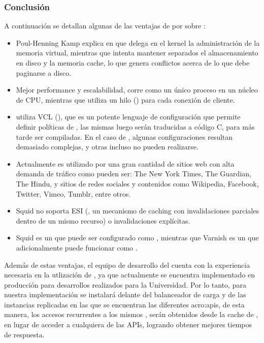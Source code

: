 \subsubsection{Conclusión}

A continuación se detallan algunas de las ventajas de  por sobre :

\begin{itemize}
  \item Poul-Henning Kamp explica en \cite{website:varnish-cache.org} que  delega en el kernel la administración de la memoria virtual, mientras que  intenta mantener separados el almacenamiento en disco y la memoria cache, lo que genera conflictos acerca de lo que debe paginarse a disco.

  \item Mejor performance y escalabilidad,  corre como un único proceso en un núcleo de CPU, mientras que  utiliza un hilo () para cada conexión de cliente.

  \item {} utiliza VCL (), que es un potente lenguaje de configuración que permite definir políticas de , las mismas luego serán traducidas a código C, para más tarde ser compiladas.  En el caso de , algunas configuraciones resultan demasiado complejas, y otras incluso no pueden realizarse.

  \item Actualmente  es utilizado por una gran cantidad de sitios web con alta demanda de tráfico como pueden ser: The New York Times, The Guardian, The Hindu, y sitios de redes sociales y contenidos como Wikipedia, Facebook, Twitter, Vimeo, Tumblr, entre otros.

  \item Squid no soporta ESI (, un mecanismo de caching con invalidaciones parciales dentro de un mismo recurso) o invalidaciones explícitas.

  \item Squid es un  que puede ser configurado como , mientras que Varnish es un  que adicionalmente puede funcionar como .
\end{itemize}

Además de estas ventajas, el equipo de desarrollo del {\cespi} cuenta con la experiencia necesaria en la utlización de , ya que actualmente se encuentra implementado en producción para desarrollos realizados para la Universidad.  Por lo tanto, para nuestra implementación se instalará  delante del balanceador de carga y de las instancias replicadas en las que se encuentran las diferentes \glspl{acro:api}, de esta manera, los accesos recurrentes a los mismos , serán obtenidos desde la cache de , en lugar de acceder a cualquiera de las APIs, logrando obtener mejores tiempos de respuesta.
